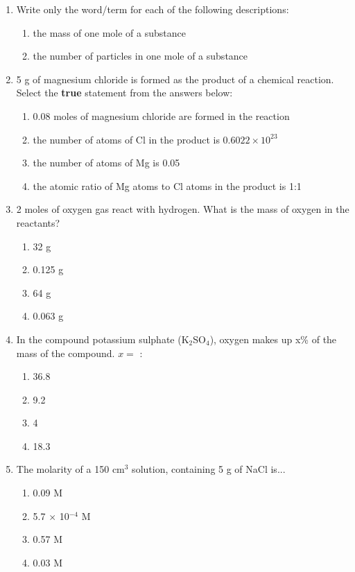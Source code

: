 \begin{eocexercises}{}
\begin{enumerate}
\item{Write only the word/term for each of the following descriptions:}
\begin{enumerate}
\item{the mass of one mole of a substance}
\item{the number of particles in one mole of a substance}
\end{enumerate}

\item{5 g of magnesium chloride is formed as the product of a chemical reaction. Select the \textbf{true} statement from the answers below:}
\begin{enumerate}
\item{0.08 moles of magnesium chloride are formed in the reaction}
\item{the number of atoms of Cl in the product is $0.6022 \times 10^{23}$}
\item{the number of atoms of Mg is 0.05}
\item{the atomic ratio of Mg atoms to Cl atoms in the product is 1:1}
\end{enumerate}

\item{2 moles of oxygen gas react with hydrogen. What is the mass of oxygen in the reactants?}
\begin{enumerate}
\item{32 g}
\item{0.125 g}
\item{64 g}
\item{0.063 g}
\end{enumerate}

\item{In the compound potassium sulphate (K$_{2}$SO$_{4}$), oxygen makes up x\% of the mass of the compound. $x =$ :}
\begin{enumerate}
\item{36.8}
\item{9.2}
\item{4}
\item{18.3}
\end{enumerate}

\item{The molarity of a 150 cm$^{3}$ solution, containing 5 g of NaCl is...}
\begin{enumerate}
\item{0.09 M}
\item{5.7 $\times$ 10$^{-4}$ M}
\item{0.57 M}
\item{0.03 M}
\end{enumerate}


\end{enumerate}
\end{eocexercises}
